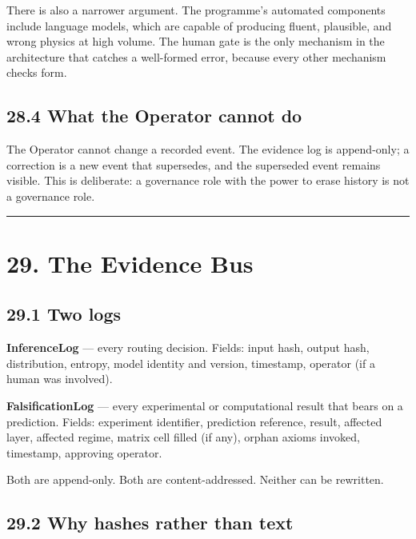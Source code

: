 \documentclass[
  11pt]{report}
\begin{document}
There is also a narrower argument. The programme's automated components
include language models, which are capable of producing fluent,
plausible, and wrong physics at high volume. The human gate is the only
mechanism in the architecture that catches a well-formed error, because
every other mechanism checks form.

\hypertarget{what-the-operator-cannot-do}{%
\section{28.4 What the Operator cannot
do}\label{what-the-operator-cannot-do}}

The Operator cannot change a recorded event. The evidence log is
append-only; a correction is a new event that supersedes, and the
superseded event remains visible. This is deliberate: a governance role
with the power to erase history is not a governance role.

\begin{center}\rule{0.5\linewidth}{0.5pt}\end{center}

\hypertarget{the-evidence-bus}{%
\chapter{29. The Evidence Bus}\label{the-evidence-bus}}

\hypertarget{two-logs}{%
\section{29.1 Two logs}\label{two-logs}}

\textbf{InferenceLog} --- every routing decision. Fields: input hash,
output hash, distribution, entropy, model identity and version,
timestamp, operator (if a human was involved).

\textbf{FalsificationLog} --- every experimental or computational result
that bears on a prediction. Fields: experiment identifier, prediction
reference, result, affected layer, affected regime, matrix cell filled
(if any), orphan axioms invoked, timestamp, approving operator.

Both are append-only. Both are content-addressed. Neither can be
rewritten.

\hypertarget{why-hashes-rather-than-text}{%
\section{29.2 Why hashes rather than
text}\label{why-hashes-rather-than-text}}
\end{document}
